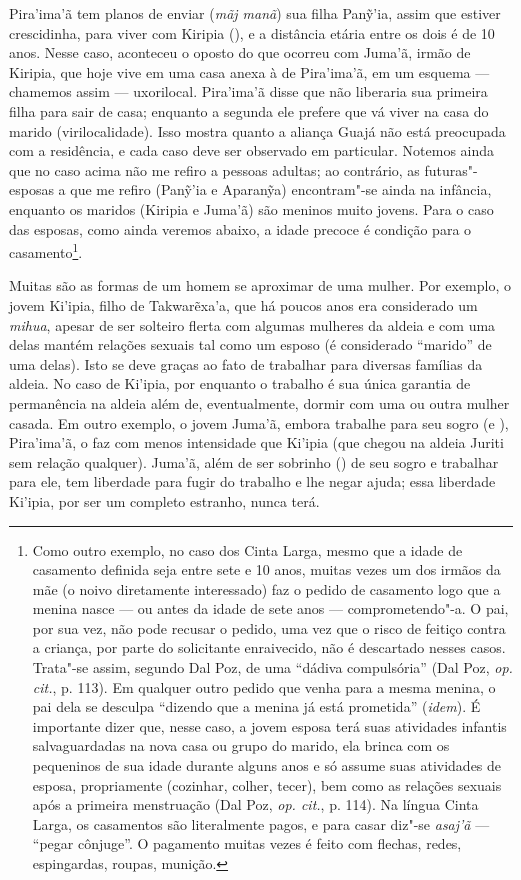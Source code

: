 Pira'ima'ã tem planos de enviar (\emph{mãj manã}) sua filha Panỹ'ia,
assim que estiver crescidinha, para viver com Kiripia (), e a
distância etária entre os dois é de 10 anos. Nesse caso, aconteceu o
oposto do que ocorreu com Juma'ã, irmão de Kiripia, que hoje vive em uma
casa anexa à de Pira'ima'ã, em um esquema --- chamemos assim --- uxorilocal.
Pira'ima'ã disse que não liberaria sua primeira filha para sair de casa;
enquanto a segunda ele prefere que vá viver na casa do marido
(virilocalidade). Isso mostra quanto a aliança Guajá não está preocupada
com a residência, e cada caso deve ser observado em particular. Notemos
ainda que no caso acima não me refiro a pessoas adultas; ao contrário,
as futuras"-esposas a que me refiro (Panỹ'ia e Aparanỹa) encontram"-se
ainda na infância, enquanto os maridos (Kiripia e Juma'ã) são meninos
muito jovens. Para o caso das esposas, como ainda veremos abaixo, a
idade precoce é condição para o casamento\footnote{Como outro exemplo,
  no caso dos Cinta Larga, mesmo que a idade de casamento definida seja
  entre sete e 10 anos, muitas vezes um dos irmãos da mãe (o noivo
  diretamente interessado) faz o pedido de casamento logo que a menina
  nasce --- ou antes da idade de sete anos --- comprometendo"-a. O pai, por
  sua vez, não pode recusar o pedido, uma vez que o risco de feitiço
  contra a criança, por parte do solicitante enraivecido, não é
  descartado nesses casos. Trata"-se assim, segundo Dal Poz, de uma
  ``dádiva compulsória'' (Dal Poz, \emph{op. cit.}, p. 113). Em qualquer outro
  pedido que venha para a mesma menina, o pai dela se desculpa ``dizendo
  que a menina já está prometida'' (\emph{idem}). É importante dizer que, nesse
  caso, a jovem esposa terá suas atividades infantis salvaguardadas na
  nova casa ou grupo do marido, ela brinca com os pequeninos de sua
  idade durante alguns anos e só assume suas atividades de esposa,
  propriamente (cozinhar, colher, tecer), bem como as relações sexuais
  após a primeira menstruação (Dal Poz, \emph{op. cit.}, p. 114). Na língua Cinta
  Larga, os casamentos são literalmente pagos, e para casar diz"-se
  \emph{asaj'ã} --- ``pegar cônjuge''. O pagamento muitas vezes é feito
  com flechas, redes, espingardas, roupas, munição.}.

Muitas são as formas de um homem se aproximar de uma mulher. Por
exemplo, o jovem Ki'ipia, filho de Takwarẽxa'a, que há poucos anos era
considerado um \emph{mihua}, apesar de ser solteiro flerta com algumas
mulheres da aldeia e com uma delas mantém relações sexuais tal como um
esposo (é considerado ``marido'' de uma delas). Isto se deve graças ao
fato de trabalhar para diversas famílias da aldeia. No caso de Ki'ipia,
por enquanto o trabalho é sua única garantia de permanência na aldeia
além de, eventualmente, dormir com uma ou outra mulher casada. Em outro
exemplo, o jovem Juma'ã, embora trabalhe para seu sogro (e ),
Pira'ima'ã, o faz com menos intensidade que Ki'ipia (que chegou na
aldeia Juriti sem relação qualquer). Juma'ã, além de ser sobrinho ()
de seu sogro e trabalhar para ele, tem liberdade para fugir do trabalho
e lhe negar ajuda; essa liberdade Ki'ipia, por ser um completo estranho,
nunca terá.

